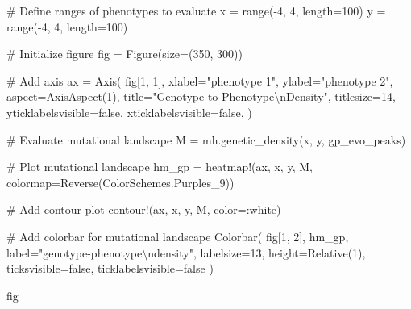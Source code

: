 \documentclass[
]{scrartcl}
\newenvironment{Shaded}{\begin{snugshade}}{\end{snugshade}}
\newcommand{\CommentTok}[1]{\textcolor[rgb]{0.37,0.37,0.37}{#1}}
\newcommand{\ConstantTok}[1]{\textcolor[rgb]{0.56,0.35,0.01}{#1}}
\newcommand{\FloatTok}[1]{\textcolor[rgb]{0.68,0.00,0.00}{#1}}
\newcommand{\FunctionTok}[1]{\textcolor[rgb]{0.28,0.35,0.67}{#1}}
\newcommand{\NormalTok}[1]{\textcolor[rgb]{0.00,0.23,0.31}{#1}}
\newcommand{\OperatorTok}[1]{\textcolor[rgb]{0.37,0.37,0.37}{#1}}
\newcommand{\SpecialCharTok}[1]{\textcolor[rgb]{0.37,0.37,0.37}{#1}}
\newcommand{\StringTok}[1]{\textcolor[rgb]{0.13,0.47,0.30}{#1}}
\begin{document}
\begin{Shaded}
\begin{Highlighting}[]
\CommentTok{\# Define ranges of phenotypes to evaluate}
\NormalTok{x }\OperatorTok{=} \FunctionTok{range}\NormalTok{(}\OperatorTok{{-}}\FloatTok{4}\NormalTok{, }\FloatTok{4}\NormalTok{, length}\OperatorTok{=}\FloatTok{100}\NormalTok{)}
\NormalTok{y }\OperatorTok{=} \FunctionTok{range}\NormalTok{(}\OperatorTok{{-}}\FloatTok{4}\NormalTok{, }\FloatTok{4}\NormalTok{, length}\OperatorTok{=}\FloatTok{100}\NormalTok{)}

\CommentTok{\# Initialize figure}
\NormalTok{fig }\OperatorTok{=} \FunctionTok{Figure}\NormalTok{(size}\OperatorTok{=}\NormalTok{(}\FloatTok{350}\NormalTok{, }\FloatTok{300}\NormalTok{))}

\CommentTok{\# Add axis}
\NormalTok{ax }\OperatorTok{=} \FunctionTok{Axis}\NormalTok{(}
\NormalTok{    fig[}\FloatTok{1}\NormalTok{, }\FloatTok{1}\NormalTok{],}
\NormalTok{    xlabel}\OperatorTok{=}\StringTok{"phenotype 1"}\NormalTok{,}
\NormalTok{    ylabel}\OperatorTok{=}\StringTok{"phenotype 2"}\NormalTok{,}
\NormalTok{    aspect}\OperatorTok{=}\FunctionTok{AxisAspect}\NormalTok{(}\FloatTok{1}\NormalTok{),}
\NormalTok{    title}\OperatorTok{=}\StringTok{"Genotype{-}to{-}Phenotype}\SpecialCharTok{\textbackslash{}n}\StringTok{Density"}\NormalTok{,}
\NormalTok{    titlesize}\OperatorTok{=}\FloatTok{14}\NormalTok{,}
\NormalTok{    yticklabelsvisible}\OperatorTok{=}\ConstantTok{false}\NormalTok{,}
\NormalTok{    xticklabelsvisible}\OperatorTok{=}\ConstantTok{false}\NormalTok{,}
\NormalTok{)}

\CommentTok{\# Evaluate mutational landscape}
\NormalTok{M }\OperatorTok{=}\NormalTok{ mh.}\FunctionTok{genetic\_density}\NormalTok{(x, y, gp\_evo\_peaks)}

\CommentTok{\# Plot mutational landscape}
\NormalTok{hm\_gp }\OperatorTok{=} \FunctionTok{heatmap!}\NormalTok{(ax, x, y, M, colormap}\OperatorTok{=}\FunctionTok{Reverse}\NormalTok{(ColorSchemes.Purples\_9))}

\CommentTok{\# Add contour plot}
\FunctionTok{contour!}\NormalTok{(ax, x, y, M, color}\OperatorTok{=:}\NormalTok{white)}

\CommentTok{\# Add colorbar for mutational landscape}
\FunctionTok{Colorbar}\NormalTok{(}
\NormalTok{    fig[}\FloatTok{1}\NormalTok{, }\FloatTok{2}\NormalTok{],}
\NormalTok{    hm\_gp,}
\NormalTok{    label}\OperatorTok{=}\StringTok{"genotype{-}phenotype}\SpecialCharTok{\textbackslash{}n}\StringTok{density"}\NormalTok{,}
\NormalTok{    labelsize}\OperatorTok{=}\FloatTok{13}\NormalTok{,}
\NormalTok{    height}\OperatorTok{=}\FunctionTok{Relative}\NormalTok{(}\FloatTok{1}\NormalTok{),}
\NormalTok{    ticksvisible}\OperatorTok{=}\ConstantTok{false}\NormalTok{,}
\NormalTok{    ticklabelsvisible}\OperatorTok{=}\ConstantTok{false}
\NormalTok{)}

\NormalTok{fig}
\end{Highlighting}
\end{Shaded}
\end{document}
